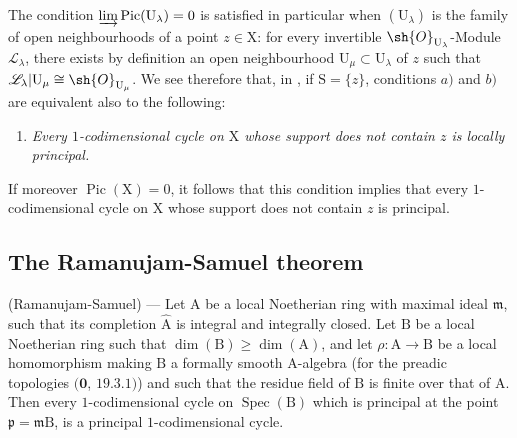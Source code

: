 \begin{remark}[21.13.16]
The condition $\varinjlim\operatorname{Pic}(\mathrm{U}_\lambda)=0$ is satisfied in particular when $(\mathrm{U}_\lambda)$ is the family of open neighbourhoods of a point $z\in\mathrm{X}$: for every invertible $\sh{O}_{\mathrm{U}_\lambda}$-Module $\mathscr{L}_\lambda$, there exists by definition an open neighbourhood $\mathrm{U}_\mu\subset\mathrm{U}_\lambda$ of $z$ such that $\mathscr{L}_\lambda|\mathrm{U}_\mu\cong\sh{O}_{\mathrm{U}_\mu}$.
We see therefore that, in , if $\mathrm{S}=\{z\}$, conditions $a)$ and $b)$ are equivalent also to the following:
\begin{enumerate}
  \item[c)] \emph{Every $1$-codimensional cycle on $\mathrm{X}$ whose support does not contain $z$ is locally principal.}
\end{enumerate}

If moreover $\operatorname{Pic}(\mathrm{X})=0$, it follows that this condition implies that every $1$-codimensional cycle on $\mathrm{X}$ whose support does not contain $z$ is principal.
\end{remark}

\subsection{The Ramanujam-Samuel theorem}
\label{subsection:IV.21.14}
\label{IV.21.14}

\begin{theorem}[21.14.1]
\label{IV.21.14.1}
\textup{(Ramanujam-Samuel)} ---
Let $\mathrm{A}$ be a local Noetherian ring with maximal ideal $\mathfrak{m}$, such that its completion $\widehat{\mathrm{A}}$ is integral and integrally closed.
Let $\mathrm{B}$ be a local Noetherian ring such that $\dim(\mathrm{B})\geq\dim(\mathrm{A})$, and let $\rho:\mathrm{A}\to\mathrm{B}$ be a local homomorphism making $\mathrm{B}$ a formally smooth $\mathrm{A}$-algebra (for the preadic topologies $(\mathbf{0}$, $19.3.1)$) and such that the residue field of $\mathrm{B}$ is finite over that of $\mathrm{A}$.
Then every $1$-codimensional cycle on $\operatorname{Spec}(\mathrm{B})$ which is principal at the point $\mathfrak{p}=\mathfrak{m}\mathrm{B}$, is a principal $1$-codimensional cycle.
\end{theorem}

